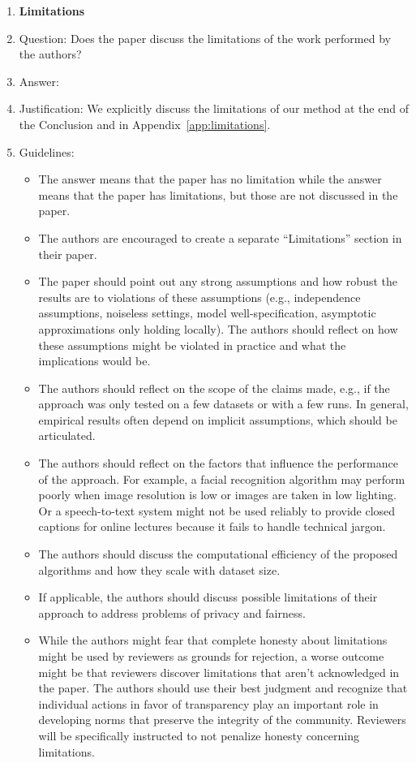 \begin{enumerate}
\item {\bf Limitations}
    \item[] Question: Does the paper discuss the limitations of the work performed by the authors?
    \item[] Answer: \answerYes{}
    \item[] Justification: We explicitly discuss the limitations of our method at the end of the Conclusion and in Appendix~\ref{app:limitations}.
    \item[] Guidelines:
    \begin{itemize}
        \item The answer \answerNA{} means that the paper has no limitation while the answer \answerNo{} means that the paper has limitations, but those are not discussed in the paper.
        \item The authors are encouraged to create a separate ``Limitations'' section in their paper.
        \item The paper should point out any strong assumptions and how robust the results are to violations of these assumptions (e.g., independence assumptions, noiseless settings, model well-specification, asymptotic approximations only holding locally). The authors should reflect on how these assumptions might be violated in practice and what the implications would be.
        \item The authors should reflect on the scope of the claims made, e.g., if the approach was only tested on a few datasets or with a few runs. In general, empirical results often depend on implicit assumptions, which should be articulated.
        \item The authors should reflect on the factors that influence the performance of the approach. For example, a facial recognition algorithm may perform poorly when image resolution is low or images are taken in low lighting. Or a speech-to-text system might not be used reliably to provide closed captions for online lectures because it fails to handle technical jargon.
        \item The authors should discuss the computational efficiency of the proposed algorithms and how they scale with dataset size.
        \item If applicable, the authors should discuss possible limitations of their approach to address problems of privacy and fairness.
        \item While the authors might fear that complete honesty about limitations might be used by reviewers as grounds for rejection, a worse outcome might be that reviewers discover limitations that aren't acknowledged in the paper. The authors should use their best judgment and recognize that individual actions in favor of transparency play an important role in developing norms that preserve the integrity of the community. Reviewers will be specifically instructed to not penalize honesty concerning limitations.
    \end{itemize}


\end{enumerate}
